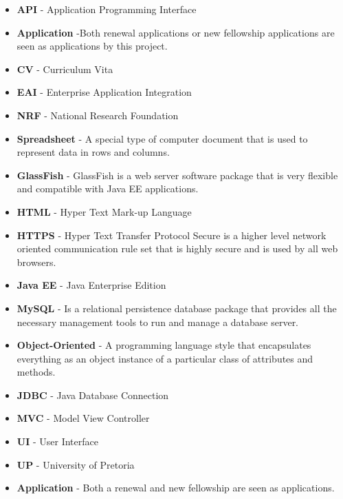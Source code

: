 \documentclass[12pt]{article}
\begin{document}
\begin{itemize}

\item \textbf{API} - Application Programming Interface
\item \textbf{Application} -Both renewal applications or new fellowship applications are seen as applications by this project.
\item \textbf{CV} - Curriculum Vita
\item \textbf{EAI} - Enterprise Application Integration
\item \textbf{NRF} - National Research Foundation
\item \textbf{Spreadsheet} - A special type of computer document that is used to represent data in rows and columns.
\item \textbf{GlassFish} - GlassFish is a web server software package that is very flexible and compatible with Java EE applications. 
\item \textbf{HTML} - Hyper Text Mark-up Language
\item \textbf{HTTPS} - Hyper Text Transfer Protocol Secure is a higher level network oriented communication rule set that is highly secure and is used by all web browsers. 
\item \textbf{Java EE} - Java Enterprise Edition
\item \textbf{MySQL} - Is a relational persistence database package that provides all the necessary management tools to run and manage a database server.
\item \textbf{Object-Oriented} - A programming language style that encapsulates everything as an object instance of a particular class of attributes and methods.
\item \textbf{JDBC} - Java Database Connection
\item \textbf{MVC} - Model View Controller
\item \textbf{UI} - User Interface
\item \textbf{UP} - University of Pretoria
\item \textbf{Application} - Both a renewal and new fellowship are seen as applications.

\end{itemize}	


\vspace{0.5in}
\end{document}
